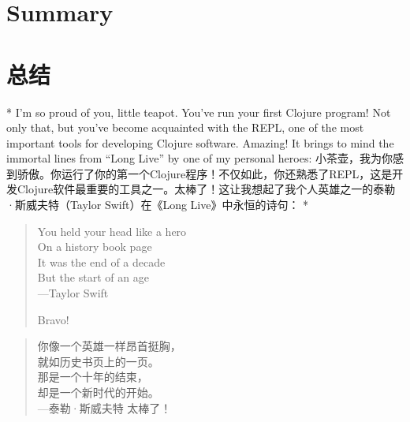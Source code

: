 \begin{paracol}{2}
\section{Summary}
\switchcolumn
\section{总结}
\switchcolumn[0]*
I'm so proud of you, little teapot. You've run your first Clojure
program! Not only that, but you've become acquainted with the REPL, one
of the most important tools for developing Clojure software. Amazing! It
brings to mind the immortal lines from ``Long Live'' by one of my
personal heroes:
\switchcolumn
小茶壶，我为你感到骄傲。你运行了你的第一个Clojure程序！不仅如此，你还熟悉了REPL，这是开发Clojure软件最重要的工具之一。太棒了！这让我想起了我个人英雄之一的泰勒·斯威夫特（Taylor Swift）在《Long Live》中永恒的诗句：
\switchcolumn[0]*
\begin{quote}
You held your head like a hero\\
On a history book page\\
It was the end of a decade\\
But the start of an age\\

\hfill ---Taylor Swift

Bravo!
\end{quote}
\switchcolumn
\begin{quote}
你像一个英雄一样昂首挺胸，\\
就如历史书页上的一页。\\
那是一个十年的结束，\\
却是一个新时代的开始。\\

\hfill ---泰勒·斯威夫特
太棒了！
\end{quote}
\end{paracol}
